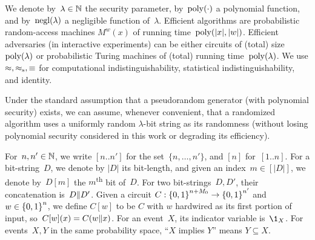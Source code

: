 We denote by~${\lambda\in{\mathbb{N}}}$ the security parameter,
by~$\operatorname{poly}({\cdot})$ a polynomial function, and
by~$\operatorname{negl}(\lambda)$ a negligible function of~$\lambda$.
Efficient algorithms are probabilistic random-access machines $M^w(x)$ of running time~$\operatorname{poly}(|x|,|w|)$.
Efficient adversaries (in interactive experiments) can be either circuits of (total) size~$\operatorname{poly}(\lambda)$ or probabilistic Turing machines of (total) running time~$\operatorname{poly}(\lambda)$.
We use $\approx,\approx_{\textup{s}},\equiv$ for computational indistinguishability, statistical indistinguishability, and identity.

Under the standard assumption that a pseudorandom generator (with polynomial security) exists,
we can assume, whenever convenient, that a randomized algorithm uses a uniformly random $\lambda$-bit string as its randomness (without losing polynomial security considered in this work or degrading its efficiency).

For~${n,n'\in{\mathbb{N}}}$, we write $[n..n']$ for the set~$\{n,\dots,n'\}$,
and $[n]$ for~$[1..n]$.
For a bit-string~$D$, we denote by $|D|$ its bit-length,
and given an index~${m\in[|D|]}$, we denote by~$D[m]$ the $m$\textsuperscript{th} bit of~$D$.
For two bit-strings~$D,D'$, their concatenation is~${D{\parallel} D'}$.
Given a circuit ${C:{\{0,1\}}^{n+M_0}\to{\{0,1\}}^{n'}}$ and ${w\in{\{0,1\}}^n}$, we define $C[w]$ to be $C$ with $w$ hardwired as its first portion of input,
so~${C[w](x)=C(w{\parallel} x)}$.
For an event~$X$, its indicator variable is~$\1_X$.
For events~$X,Y$ in the same probability space, ``$X$ implies $Y$'' means ${Y\subseteq X}$.

